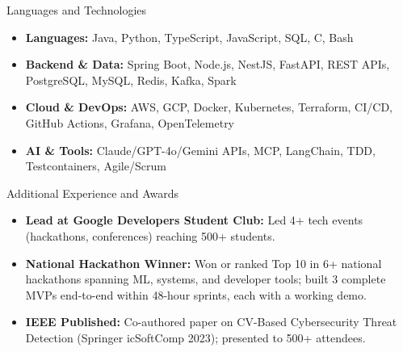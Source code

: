 \documentclass[]{mcdowellcv}
\begin{document}
\begin{cvsection}{Languages and Technologies}
  \begin{cvsubsection}{}{}{}
    \begin{itemize}
      \item \textbf{Languages:} Java, Python, TypeScript, JavaScript, SQL, C, Bash
      \item \textbf{Backend \& Data:} Spring Boot, Node.js, NestJS, FastAPI, REST APIs, PostgreSQL, MySQL, Redis, Kafka, Spark
      \item \textbf{Cloud \& DevOps:} AWS, GCP, Docker, Kubernetes, Terraform, CI/CD, GitHub Actions, Grafana, OpenTelemetry
      \item \textbf{AI \& Tools:} Claude/GPT-4o/Gemini APIs, MCP, LangChain, TDD, Testcontainers, Agile/Scrum
    \end{itemize}
  \end{cvsubsection}
\end{cvsection}

\begin{cvsection}{Additional Experience and Awards}
  \begin{cvsubsection}{}{}{}
    \begin{itemize}
      \item \textbf{Lead at Google Developers Student Club:} Led 4+ tech events (hackathons, conferences) reaching 500+ students.
      \item \textbf{National Hackathon Winner:} Won or ranked Top 10 in 6+ national hackathons spanning ML, systems, and developer tools; built 3 complete MVPs end-to-end within 48-hour sprints, each with a working demo.
      \item \textbf{IEEE Published:} Co-authored paper on CV-Based Cybersecurity Threat Detection (Springer icSoftComp 2023); presented to 500+ attendees.
    \end{itemize}
  \end{cvsubsection}
\end{cvsection}
\end{document}
